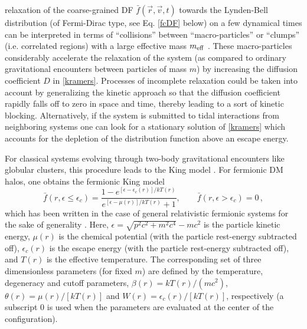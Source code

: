  relaxation of the coarse-grained DF $\bar{f}({\vec r},{\vec v},t)$ towards the Lynden-Bell distribution (of Fermi-Dirac type, see Eq. \ref{fcDF} below) on a few dynamical times can be interpreted in terms of ``collisions'' between  ``macro-particles'' or ``clumps'' (i.e. correlated regions) with a large effective mass $m_{\rm
eff}$ \citep{1970PhRvL..25.1155K}. These macro-particles considerably accelerate the relaxation of the system (as compared to ordinary gravitational encounters between particles of mass $m$) by increasing the diffusion coefficient $D$ in \cref{kramers}. Processes of incomplete relaxation could be taken into account by generalizing the kinetic approach so that the diffusion coefficient rapidly falls off to zero in space and time, thereby leading to a sort of kinetic blocking. Alternatively, if the system is submitted to tidal interactions from neighboring systems one can look for a stationary solution of \cref{kramers} which accounts for the depletion of the distribution function above an escape energy.

For classical systems evolving through two-body gravitational encounters like globular clusters, this procedure leads to the King model \citep{1962AJ.....67..471K}. For fermionic DM halos, one obtains the fermionic King model \citep{1983A&A...119...35R,1998MNRAS.300..981C} 
%
\begin{equation}
    \bar{f}(r,\epsilon\leq\epsilon_c) = \frac{1-e^{[\epsilon-\epsilon_c(r)]/kT(r)}}{e^{[\epsilon-\mu(r)]/kT(r)}+1}, \qquad \bar{f}(r,\epsilon>\epsilon_c)=0\, ,
    \label{fcDF}
\end{equation} 
%
which has been written in the case of general relativistic fermionic systems for the sake of generality \citep{2018PDU....21...82A,2022IJMPD..3130002A}. Here, $\epsilon=\sqrt{p^2c^2 + m^2 c^4} - mc^2$ is the particle kinetic energy, $\mu(r)$ is the chemical potential (with the particle rest-energy subtracted off), $\epsilon_c(r)$ is the escape energy (with the particle rest-energy subtracted off), and $T(r)$ is the effective temperature. The corresponding set of three dimensionless parameters (for fixed $m$) are defined by the temperature, degeneracy and cutoff parameters, $\beta(r)=k T(r)/(m c^2)$, $\theta(r)=\mu(r)/[k T(r)]$ and $W(r)=\epsilon_c(r)/[k T(r)]$, respectively (a subscript $0$ is used when the parameters are evaluated at the center of the configuration).


